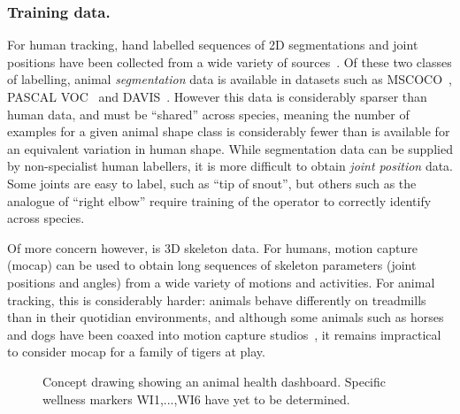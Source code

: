     \subsubsection*{Training data.}
    For human tracking, hand labelled sequences of 2D segmentations and joint positions have been collected from a wide variety of sources~\cite{andriluka14cvpr,lin2014microsoft,johnson2010clustered}. Of these two classes of labelling, animal {\em segmentation} data is available in datasets such as MSCOCO~\cite{lin2014microsoft}, PASCAL VOC~\cite{everingham2010pascal} and DAVIS~\cite{Perazzi2016}.  However this data is considerably sparser than human data, and must be ``shared'' across species, meaning the number of examples for a given animal shape class is considerably fewer than is available for an equivalent variation in human shape.  While segmentation data can be supplied by non-specialist human labellers, it is more difficult to obtain {\em joint position} data.  Some joints are easy to label, such as ``tip of snout'', but others such as the analogue of ``right elbow'' require training of the operator to correctly identify across species.

    Of more concern however, is 3D skeleton data.  For humans, motion capture (mocap) can be used to obtain long sequences of skeleton parameters (joint positions and angles) from a wide variety of motions and activities.
    For animal tracking, this is considerably harder: animals behave differently on treadmills than in their quotidian environments, and although some animals such as horses and dogs have been coaxed into motion capture studios~\cite{wilhelm2015furyexplorer}, it remains impractical to consider mocap for a family of tigers at play.

\begin{figure}[H] %
    \caption{Concept drawing showing an animal health dashboard. Specific wellness markers WI1,...,WI6 have yet to be determined.}
    \label{fig:wellness_dashboard}
\end{figure}


